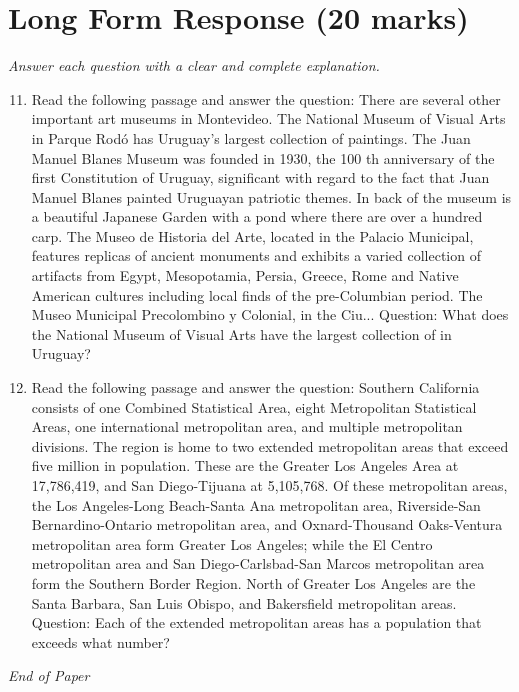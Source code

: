\documentclass[12pt]{article}
\begin{document}
\section*{Long Form Response (20 marks)}
\textit{Answer each question with a clear and complete explanation.}
\begin{enumerate}[label=\arabic*.]
\setcounter{enumi}{10}
\item Read the following passage and answer the question: There are several other important art museums in Montevideo. The National Museum of Visual Arts in Parque Rodó has Uruguay's largest collection of paintings. The Juan Manuel Blanes Museum was founded in 1930, the 100 th anniversary of the first Constitution of Uruguay, significant with regard to the fact that Juan Manuel Blanes painted Uruguayan patriotic themes. In back of the museum is a beautiful Japanese Garden with a pond where there are over a hundred carp. The Museo de Historia del Arte, located in the Palacio Municipal, features replicas of ancient monuments and exhibits a varied collection of artifacts from Egypt, Mesopotamia, Persia, Greece, Rome and Native American cultures including local finds of the pre-Columbian period. The Museo Municipal Precolombino y Colonial, in the Ciu... Question: What does the National Museum of Visual Arts have the largest collection of in Uruguay?
\item Read the following passage and answer the question: Southern California consists of one Combined Statistical Area, eight Metropolitan Statistical Areas, one international metropolitan area, and multiple metropolitan divisions. The region is home to two extended metropolitan areas that exceed five million in population. These are the Greater Los Angeles Area at 17,786,419, and San Diego-Tijuana at 5,105,768. Of these metropolitan areas, the Los Angeles-Long Beach-Santa Ana metropolitan area, Riverside-San Bernardino-Ontario metropolitan area, and Oxnard-Thousand Oaks-Ventura metropolitan area form Greater Los Angeles; while the El Centro metropolitan area and San Diego-Carlsbad-San Marcos metropolitan area form the Southern Border Region. North of Greater Los Angeles are the Santa Barbara, San Luis Obispo, and Bakersfield metropolitan areas. Question: Each of the extended metropolitan areas has a population that exceeds what number?
\end{enumerate}

\vfill
\noindent\textit{End of Paper}
\end{document}
